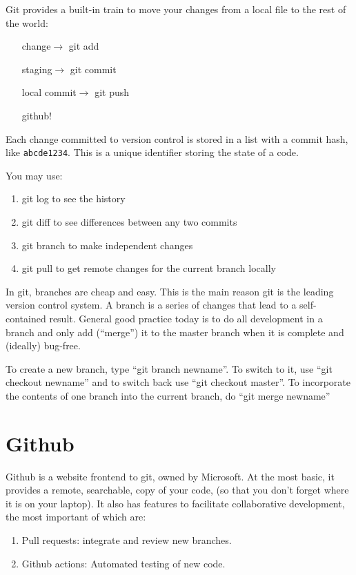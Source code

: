 \documentclass[12pt]{article}
\begin{document}
Git provides a built-in train to move your changes from a local file to the rest of the world:

\begin{enumerate}
 \item[change$\rightarrow$] git add
 \item[staging$\rightarrow$] git commit
 \item[local commit$\rightarrow$] git push
 \item[github!]
\end{enumerate}

Each change committed to version control is stored in a list with a commit hash, like \texttt{abcde1234}. This is a unique identifier storing the state of a code.

You may use:
\begin{enumerate}
 \item git log to see the history
 \item git diff to see differences between any two commits
 \item git branch to make independent changes
 \item git pull to get remote changes for the current branch locally
\end{enumerate}

In git, branches are cheap and easy. This is the main reason git is the leading version control system. A branch is a series of changes that lead to a self-contained result. General good practice today is to do all development in a branch and only add (``merge'') it to the master branch when it is complete and (ideally) bug-free.

To create a new branch, type ``git branch newname''. To switch to it, use ``git checkout newname'' and to switch back use ``git checkout master''. To incorporate the contents of one branch into the current branch, do ``git merge newname''

\section{Github}

Github is a website frontend to git, owned by Microsoft. At the most basic, it provides a remote, searchable, copy of your code, (so that you don't forget where it is on your laptop). It also has features to facilitate collaborative development, the most important of which are:

\begin{enumerate}
 \item Pull requests: integrate and review new branches.
 \item Github actions: Automated testing of new code.
\end{enumerate}
\end{document}
